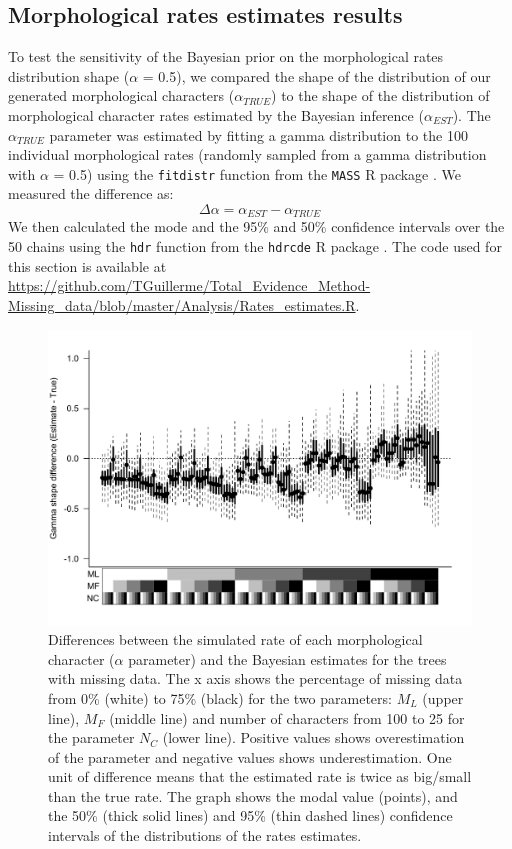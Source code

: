 \documentclass[12pt,letterpaper]{article}
\begin{document}
\subsection{Morphological rates estimates results}
To test the sensitivity of the Bayesian prior on the morphological rates distribution shape ($\alpha$ = 0.5), we compared the shape of the distribution of our generated morphological characters ($\alpha_{TRUE}$) to the shape of the distribution of morphological character rates estimated by the Bayesian inference ($\alpha_{EST}$).
The $\alpha_{TRUE}$ parameter was estimated by fitting a gamma distribution to the 100 individual morphological rates (randomly sampled from a gamma distribution with $\alpha$ = 0.5) using the \texttt{fitdistr} function from the \texttt{MASS} R package \citep{MASS}.
We measured the difference as:
\begin{equation}
\Delta\alpha=\alpha_{EST} - \alpha_{TRUE}
\end{equation}
We then calculated the mode and the 95\% and 50\% confidence intervals over the 50 chains using the \texttt{hdr} function from the \texttt{hdrcde} R package \citep{hdrcde}.
The code used for this section is available at \url{https://github.com/TGuillerme/Total_Evidence_Method-Missing_data/blob/master/Analysis/Rates_estimates.R}.

\begin{figure}
\centering
\includegraphics[width=\textwidth,keepaspectratio]{SupplementaryFigures/Rates_estimates.pdf}
\caption{Differences between the simulated rate of each morphological character ($\alpha$ parameter) and the Bayesian estimates for the trees with missing data. The x axis shows the percentage of missing data from 0\% (white) to 75\% (black) for the two parameters: $M_{L}$ (upper line), $M_{F}$ (middle line) and number of characters from 100 to 25 for the parameter $N_{C}$ (lower line). Positive values shows overestimation of the parameter and negative values shows underestimation. One unit of difference means that the estimated rate is twice as big/small than the true rate. The graph shows the modal value (points), and the 50\% (thick solid lines) and 95\% (thin dashed lines) confidence intervals of the distributions of the rates estimates.}
\label{Fig_AppendixRates}
\end{figure}
\end{document}
